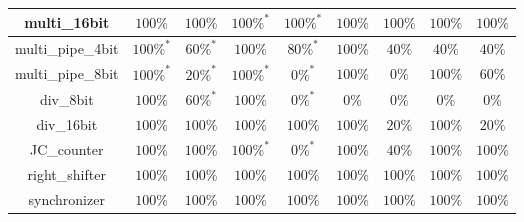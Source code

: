 \begin{tabular}{c|cc|cc|cc|cc}
multi\_16bit & \color{black} {\cellcolor{lightblue}} $100\%$ & \color{black} {\cellcolor{lightgreen}} $100\%$ & \color{black} {\cellcolor{lightblue}} $100\%^*$ & \color{black} {\cellcolor{lightgreen}} $100\%^*$ & \color{black} {\cellcolor{lightblue}} $100\%$ & \color{black} {\cellcolor{lightgreen}} $100\%$ & \color{black} {\cellcolor{lightblue}} $100\%$ & \color{black} {\cellcolor{lightgreen}} $100\%$ \\ \midrule
multi\_pipe\_4bit & \color{black} {\cellcolor{lightblue}} $100\%^*$ & $60\%^*$ & \color{black} {\cellcolor{lightblue}} $100\%$ & \color{black} {\cellcolor{lightgreen}} $80\%^*$ & \color{black} {\cellcolor{lightblue}} $100\%$ & $40\%$ & $40\%$ & $40\%$ \\ \midrule
multi\_pipe\_8bit & \color{black} {\cellcolor{lightblue}} $100\%^*$ & $20\%^*$ & \color{black} {\cellcolor{lightblue}} $100\%^*$ & $0\%^*$ & \color{black} {\cellcolor{lightblue}} $100\%$ & $0\%$ & \color{black} {\cellcolor{lightblue}} $100\%$ & \color{black} {\cellcolor{lightgreen}} $60\%$ \\ \midrule
div\_8bit & \color{black} {\cellcolor{lightblue}} $100\%$ & \color{black} {\cellcolor{lightgreen}} $60\%^*$ & \color{black} {\cellcolor{lightblue}} $100\%$ & $0\%^*$ & $0\%$ & $0\%$ & $0\%$ & $0\%$ \\ \midrule
div\_16bit & \color{black} {\cellcolor{lightblue}} $100\%$ & \color{black} {\cellcolor{lightgreen}} $100\%$ & \color{black} {\cellcolor{lightblue}} $100\%$ & \color{black} {\cellcolor{lightgreen}} $100\%$ & \color{black} {\cellcolor{lightblue}} $100\%$ & $20\%$ & \color{black} {\cellcolor{lightblue}} $100\%$ & $20\%$ \\ \midrule
JC\_counter & \color{black} {\cellcolor{lightblue}} $100\%$ & \color{black} {\cellcolor{lightgreen}} $100\%$ & \color{black} {\cellcolor{lightblue}} $100\%^*$ & $0\%^*$ & \color{black} {\cellcolor{lightblue}} $100\%$ & $40\%$ & \color{black} {\cellcolor{lightblue}} $100\%$ & \color{black} {\cellcolor{lightgreen}} $100\%$ \\ \midrule
right\_shifter & \color{black} {\cellcolor{lightblue}} $100\%$ & \color{black} {\cellcolor{lightgreen}} $100\%$ & \color{black} {\cellcolor{lightblue}} $100\%$ & \color{black} {\cellcolor{lightgreen}} $100\%$ & \color{black} {\cellcolor{lightblue}} $100\%$ & \color{black} {\cellcolor{lightgreen}} $100\%$ & \color{black} {\cellcolor{lightblue}} $100\%$ & \color{black} {\cellcolor{lightgreen}} $100\%$ \\ \midrule
synchronizer & \color{black} {\cellcolor{lightblue}} $100\%$ & \color{black} {\cellcolor{lightgreen}} $100\%$ & \color{black} {\cellcolor{lightblue}} $100\%$ & \color{black} {\cellcolor{lightgreen}} $100\%$ & \color{black} {\cellcolor{lightblue}} $100\%$ & \color{black} {\cellcolor{lightgreen}} $100\%$ & \color{black} {\cellcolor{lightblue}} $100\%$ & \color{black} {\cellcolor{lightgreen}} $100\%$ \\ \midrule

\end{tabular}
